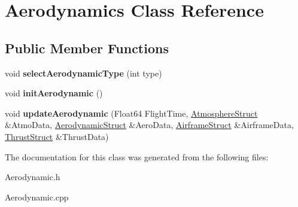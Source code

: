 \hypertarget{class_aerodynamics}{}\section{Aerodynamics Class Reference}
\label{class_aerodynamics}
\subsection*{Public Member Functions}
\begin{DoxyCompactItemize}
\item 
\mbox{\label{class_aerodynamics_a9aa3397e8b1d91ed237146a57bbe6bcf}} 
void {\bfseries select\+Aerodynamic\+Type} (int type)
\item 
\mbox{\label{class_aerodynamics_a2382a1b24c0b3948629103747cce3db1}} 
void {\bfseries init\+Aerodynamic} ()
\item 
\mbox{\label{class_aerodynamics_adf6047b063022ff3b689e269d2b35863}} 
void {\bfseries update\+Aerodynamic} (Float64 Flight\+Time, \hyperlink{group___data_cloud_struct_atmosphere_struct}{Atmosphere\+Struct} \&Atmo\+Data, \hyperlink{group___data_cloud_struct_aerodynamic_struct}{Aerodynamic\+Struct} \&Aero\+Data, \hyperlink{group___data_cloud_struct_airframe_struct}{Airframe\+Struct} \&Airframe\+Data, \hyperlink{group___data_cloud_struct_thrust_struct}{Thrust\+Struct} \&Thrust\+Data)
\end{DoxyCompactItemize}


The documentation for this class was generated from the following files\+:\begin{DoxyCompactItemize}
\item 
Aerodynamic.\+h\item 
Aerodynamic.\+cpp\end{DoxyCompactItemize}
